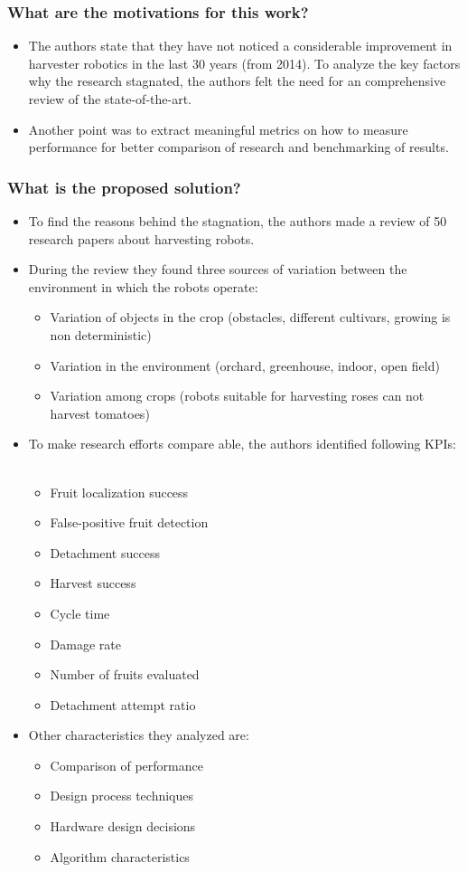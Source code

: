 \subsubsection*{What are the motivations for this work?}
\begin{itemize}
    \item The authors state that they have not noticed a considerable improvement in harvester robotics in the last 30 years (from 2014). To analyze the key factors why the research stagnated, the authors felt the need for an comprehensive review of the state-of-the-art.
    \item Another point was to extract meaningful metrics on how to measure performance for better comparison of research and benchmarking of results.
\end{itemize}
\subsubsection*{What is the proposed solution?}
\begin{itemize}
    \item To find the reasons behind the stagnation, the authors made a review of 50 research papers about harvesting robots. 
    \item During the review they found three sources of variation between the environment in which the robots operate: \ \begin{itemize}
        \item Variation of objects in the crop (obstacles, different cultivars, growing is non deterministic)
        \item Variation in the environment (orchard, greenhouse, indoor, open field)
        \item Variation among crops (robots suitable for harvesting roses can not harvest tomatoes)
    \end{itemize}
    \item To make research efforts compare able, the authors identified following KPIs: \ \begin{itemize}
        \item Fruit localization success
        \item False-positive fruit detection
        \item Detachment success
        \item Harvest success
        \item Cycle time
        \item Damage rate
        \item Number of fruits evaluated
        \item Detachment attempt ratio
    \end{itemize}
    \item Other characteristics they analyzed are: \ \begin{itemize}
        \item Comparison of performance
        \item Design process techniques
        \item Hardware design decisions
        \item Algorithm characteristics 
    \end{itemize}
\end{itemize}
